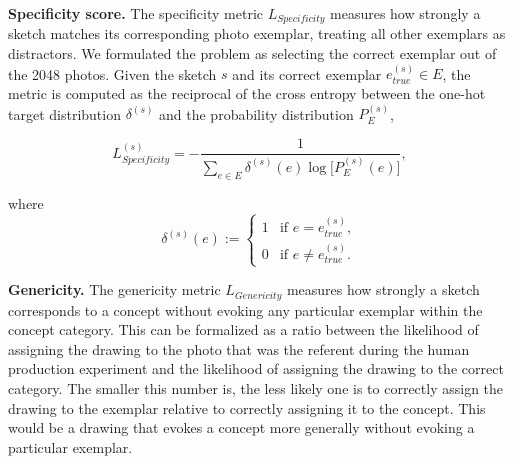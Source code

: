 \documentclass[10pt,letterpaper]{article}
\begin{document}



\textbf{Specificity score.} 
The specificity metric $L_{Specificity}$ measures how strongly a sketch matches its corresponding photo exemplar, treating all other exemplars as distractors. We formulated the problem as selecting the correct exemplar out of the 2048 photos. Given the sketch $s$ and its correct exemplar $e_{true}^{(s)}\in E$, the metric is computed as the reciprocal of the cross entropy between the one-hot target distribution $\delta^{(s)}$ and the probability distribution $P_{E}^{(s)}$,

\begin{equation}\label{eq:specificity}
    L_{Specificity}^{(s)} =-\frac{1}{\sum_{e\in E}{\delta^{(s)}(e) \log{[P_{E}^{(s)}(e)}]}},
\end{equation}

where 
\begin{equation}\label{eq:one hot}
    \delta^{(s)}(e) :=
    \begin{cases}
1 &\text{if } e = e_{true}^{(s)}, \\
0 &\text{if } e \neq e_{true}^{(s)}.
\end{cases}
\end{equation}







\textbf{Genericity.} 
The genericity metric $L_{Genericity}$ measures how strongly a sketch corresponds to a concept without evoking any particular exemplar within the concept category.
This can be formalized as a ratio between the likelihood of assigning the drawing to the photo that was the referent during the human production experiment and the likelihood of assigning the drawing to the correct category. The smaller this number is, the less likely one is to correctly assign the drawing to the exemplar relative to correctly assigning it to the concept. This would be a drawing that evokes a concept more generally without evoking a particular exemplar.
\end{document}
